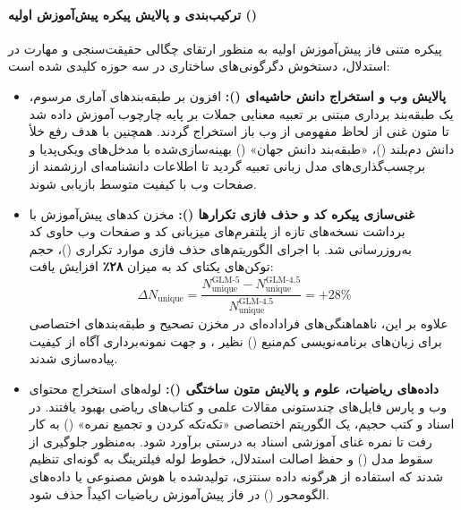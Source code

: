 \paragraph*{ترکیب‌بندی و پالایش پیکره پیش‌آموزش اولیه ()}
پیکره متنی فاز پیش‌آموزش اولیه به منظور ارتقای چگالی حقیقت‌سنجی و مهارت در استدلال، دستخوش دگرگونی‌های ساختاری در سه حوزه کلیدی شده است:
\begin{itemize}
    \item \textbf{پالایش وب و استخراج دانش حاشیه‌ای ():} افزون بر طبقه‌بندهای آماری مرسوم، یک طبقه‌بند برداری مبتنی بر تعبیه معنایی جملات بر پایه چارچوب  \cite{li2025datacomplm} آموزش داده شد تا متون غنی از لحاظ مفهومی از وب باز استخراج گردند. همچنین با هدف رفع خلأ دانش دم‌بلند ()، «طبقه‌بند دانش جهان» () بهینه‌سازی‌شده با مدخل‌های ویکی‌پدیا و برچسب‌گذاری‌های مدل زبانی تعبیه گردید تا اطلاعات دانشنامه‌ای ارزشمند از صفحات وب با کیفیت متوسط بازیابی شوند.
    \item \textbf{غنی‌سازی پیکره کد و حذف فازی تکرارها ():} مخزن کدهای پیش‌آموزش با برداشت نسخه‌های تازه از پلتفرم‌های میزبانی کد و صفحات وب حاوی کد به‌روزرسانی شد. با اجرای الگوریتم‌های حذف فازی موارد تکراری ()، حجم توکن‌های یکتای کد به میزان \textbf{۲۸٪} افزایش یافت:
    \begin{equation}
        \Delta N_{\text{unique}} = \frac{N_{\text{unique}}^{\text{GLM-5}} - N_{\text{unique}}^{\text{GLM-4.5}}}{N_{\text{unique}}^{\text{GLM-4.5}}} = +28\%
    \end{equation}
    علاوه بر این، ناهماهنگی‌های فراداده‌ای در مخزن  تصحیح و طبقه‌بندهای اختصاصی برای زبان‌های برنامه‌نویسی کم‌منبع () نظیر ،  و  جهت نمونه‌برداری آگاه از کیفیت پیاده‌سازی شدند.
    \item \textbf{داده‌های ریاضیات، علوم و پالایش متون ساختگی ():} لوله‌های استخراج محتوای وب و پارس فایل‌های چندستونی  مقالات علمی و کتاب‌های ریاضی بهبود یافتند. در اسناد و کتب حجیم، یک الگوریتم اختصاصی «تکه‌تکه کردن و تجمیع نمره» () به کار رفت تا نمره غنای آموزشی اسناد به درستی برآورد شود. به‌منظور جلوگیری از سقوط مدل () و حفظ اصالت استدلال، خطوط لوله فیلترینگ به گونه‌ای تنظیم شدند که استفاده از هرگونه داده سنتزی، تولیدشده با هوش مصنوعی یا داده‌های الگومحور () در فاز پیش‌آموزش ریاضیات اکیداً حذف شود.
\end{itemize}

